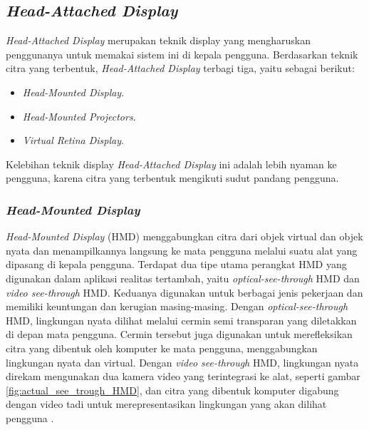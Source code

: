 \subsection {\textit{Head-Attached Display}}
\label{subsec:HAD}
\textit{Head-Attached Display} merupakan teknik display yang mengharuskan penggunanya untuk memakai sistem ini di kepala pengguna. Berdasarkan teknik citra yang terbentuk, \textit{Head-Attached Display} terbagi tiga, yaitu sebagai berikut: 
\begin{itemize}
\item \textit{Head-Mounted Display}. 
\item \textit{Head-Mounted Projectors}.
\item \textit{Virtual Retina Display}. 
\end{itemize}
Kelebihan teknik display \textit{Head-Attached Display} ini adalah lebih nyaman ke pengguna, karena citra yang terbentuk mengikuti sudut pandang pengguna.

\subsubsection {\textit{Head-Mounted Display}}
\label{subsubsec:HMD}
\textit{Head-Mounted Display} (HMD) menggabungkan citra dari objek virtual dan objek nyata dan menampilkannya langsung ke mata pengguna melalui suatu alat yang dipasang di kepala pengguna. Terdapat dua tipe utama perangkat HMD yang digunakan dalam aplikasi realitas tertambah, yaitu \textit{optical-see-through} HMD dan \textit{video see-through} HMD. Keduanya digunakan untuk berbagai jenis pekerjaan dan memiliki keuntungan dan kerugian masing-masing. Dengan \textit{optical-see-through} HMD, lingkungan nyata dilihat melalui cermin semi transparan yang diletakkan di depan mata pengguna. Cermin tersebut juga digunakan untuk merefleksikan citra yang dibentuk oleh komputer ke mata pengguna, menggabungkan lingkungan nyata dan virtual. Dengan \textit{video see-through} HMD, lingkungan nyata direkam mengunakan dua kamera video yang terintegrasi ke alat, seperti gambar \ref{fig:actual_see_trough_HMD}, dan citra yang dibentuk komputer digabung dengan video tadi untuk merepresentasikan lingkungan yang akan dilihat pengguna \cite{Rolland1994}.

